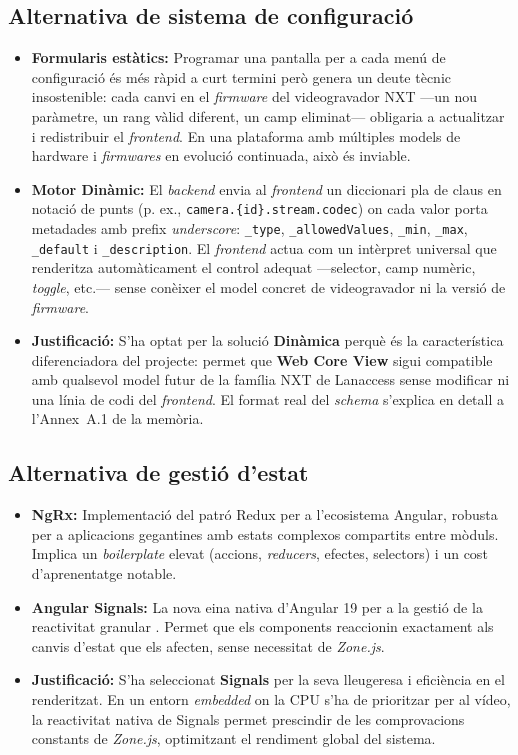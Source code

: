 \subsection{Alternativa de sistema de configuració}
\begin{itemize}
  \item \textbf{Formularis estàtics:} Programar una pantalla per a cada menú de configuració és més ràpid a curt termini però genera un deute tècnic insostenible: cada canvi en el \textit{firmware} del videogravador NXT —un nou paràmetre, un rang vàlid diferent, un camp eliminat— obligaria a actualitzar i redistribuir el \textit{frontend}. En una plataforma amb múltiples models de hardware i \textit{firmwares} en evolució continuada, això és inviable.
  \item \textbf{Motor Dinàmic:} El \textit{backend} envia al \textit{frontend} un diccionari pla de claus en notació de punts (p. ex., \texttt{camera.\{id\}.\allowbreak{}stream.codec}) on cada valor porta metadades amb prefix \textit{underscore}: \texttt{\_type},\allowbreak{} \texttt{\_allowedValues},\allowbreak{} \texttt{\_min},\allowbreak{} \texttt{\_max},\allowbreak{} \texttt{\_default} i \texttt{\_description}. El \textit{frontend} actua com un intèrpret universal que renderitza automàticament el control adequat —selector, camp numèric, \textit{toggle}, etc.— sense conèixer el model concret de videogravador ni la versió de \textit{firmware}.
  \item \textbf{Justificació:} S'ha optat per la solució \textbf{Dinàmica} perquè és la característica diferenciadora del projecte: permet que \textbf{Web Core View} sigui compatible amb qualsevol model futur de la família NXT de Lanaccess sense modificar ni una línia de codi del \textit{frontend}. El format real del \textit{schema} s'explica en detall a l'Annex~A.1 de la memòria.
\end{itemize}

\subsection{Alternativa de gestió d'estat}
\begin{itemize}
  \item \textbf{NgRx:} Implementació del patró Redux per a l'ecosistema Angular, robusta per a aplicacions gegantines amb estats complexos compartits entre mòduls. Implica un \textit{boilerplate} elevat (accions, \textit{reducers}, efectes, selectors) i un cost d'aprenentatge notable.
  \item \textbf{Angular Signals:} La nova eina nativa d'Angular 19 per a la gestió de la reactivitat granular \cite{angular_signals}. Permet que els components reaccionin exactament als canvis d'estat que els afecten, sense necessitat de \textit{Zone.js}.
  \item \textbf{Justificació:} S'ha seleccionat \textbf{Signals} per la seva lleugeresa i eficiència en el renderitzat. En un entorn \textit{embedded} on la CPU s'ha de prioritzar per al vídeo, la reactivitat nativa de Signals permet prescindir de les comprovacions constants de \textit{Zone.js}, optimitzant el rendiment global del sistema.
\end{itemize}

